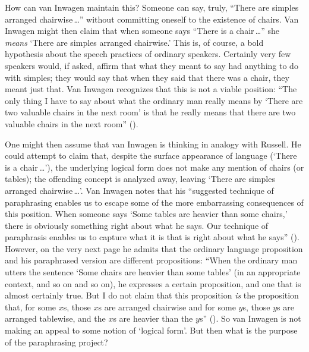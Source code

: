 \documentclass[11pt]{standalone}
\begin{document}
\begin{spacing}{1.5}
How can van Inwagen maintain this?  Someone can say, truly, ``There
are simples arranged chairwise\,\ldots '' without committing oneself
to the existence of chairs.  Van Inwagen might then claim that when
someone says ``There is a chair\,\ldots '' she {\em means} `There are
simples arranged chairwise.'  This is, of course, a bold hypothesis
about the speech practices of ordinary speakers.  Certainly very few
speakers would, if asked, affirm that what they meant to say had
anything to do with simples; they would say that when they said that
there was a chair, they meant just that.  Van Inwagen recognizes that
this is not a viable position: ``The only thing I have to say about
what the ordinary man really means by `There are two valuable chairs
in the next room' is that he really means that there are two valuable
chairs in the next room'' (\citeyear[106]{inwagen1995}).

One might then assume that van Inwagen is thinking in analogy with
Russell.  He could attempt to claim that, despite the surface
appearance of language (`There is a chair\,\ldots '), the underlying
logical form does not make any mention of chairs (or tables); the
offending concept is analyzed away, leaving `There are simples
arranged chairwise\,\ldots '.  Van Inwagen notes that his ``suggested
technique of paraphrasing enables us to escape some of the more
embarrassing consequences of this position.  When someone says `Some
tables are heavier than some chairs,' there is obviously something
right about what he says.  Our technique of paraphrasis enables us to
capture what it is that is right about what he says''
(\citeyear[111]{inwagen1995}).  However, on the very next page he
admits that the ordinary language proposition and his paraphrased
version are different propositions: ``When the ordinary man utters the
sentence `Some chairs are heavier than some tables' (in an appropriate
context, and so on and so on), he expresses a certain proposition, and
one that is almost certainly true.  But I do not claim that this
proposition {\em is} the proposition that, for some $x$s, those $x$s
are arranged chairwise and for some $y$s, those $y$s are arranged
tablewise, and the $x$s are heavier than the $y$s''
(\citeyear[112]{inwagen1995}).  So van Inwagen is not making an appeal
to some notion of `logical form'.  But then what is the purpose of the
paraphrasing project?


\end{spacing}
\end{document}
